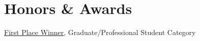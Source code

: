 \section*{Honors \& Awards}
\href{https://new.library.arizona.edu/news/2020-data-visualization-challenge-winners}{\underline{First Place Winner}}, Graduate/Professional Student Category \\
